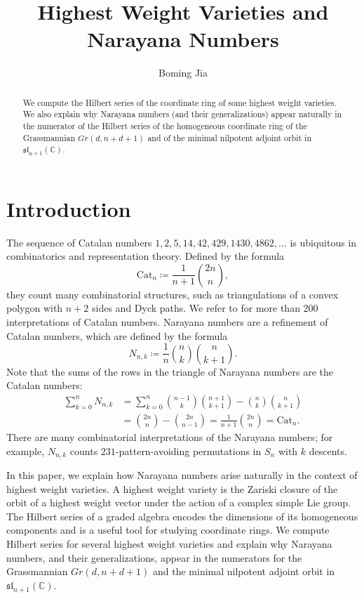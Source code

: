 \documentclass[12pt]{extarticle}
\title{Highest Weight Varieties and Narayana Numbers}
\author{Boming Jia}
\date{}
\theoremstyle{plain}
\theoremstyle{definition}
\theoremstyle{remark}
\newcommand{\Cat}{\mathrm{Cat}}
\begin{document}
\maketitle

\vspace{-5em}
\begin{abstract} 
    We compute the Hilbert series of the coordinate ring of some highest weight varieties. We also explain why Narayana numbers (and their generalizations) appear naturally in the numerator of the Hilbert series of the homogeneous coordinate ring of the Grassmannian $Gr(d,n+d+1)$ and of the minimal nilpotent adjoint orbit in $\mathfrak{sl}_\mathrm{n+1}(\mathbb{C})$.
\end{abstract}


\section{Introduction}
The sequence of Catalan numbers $1,2,5,14,42,429,1430,4862,\dots$ is ubiquitous in combinatorics and representation theory.
Defined by the formula
\[
\Cat_n \coloneqq \frac{1}{n+1} \binom{2n}{n},
\]
they count many combinatorial structures, such as triangulations of a convex polygon with \(n+2\) sides and Dyck paths. We refer to \cite{Stanley} for more than 200 interpretations of Catalan numbers.
 Narayana numbers are a refinement of Catalan numbers, which are defined by the formula
$$
N_{n, k}\coloneqq\frac{1}{n}\binom{n}{k}\binom{n}{k+1}.
$$
Note that the sums of the rows in the triangle of Narayana numbers are the Catalan numbers:
\begin{align*}
    \sum_{k=0}^n N_{n,k}
    &= \sum_{k=0}^n\binom{n-1}{k}\binom{n+1}{k+1}-\binom{n}{k}\binom{n}{k+1} \\
    &= \binom{2n}{n}-\binom{2n}{n-1}
    = \frac{1}{n+1}\binom{2n}{n}
    = \Cat_n.
\end{align*}
There are many combinatorial interpretations of the Narayana numbers; for example, $N_{n,k}$ counts $231$-pattern-avoiding permutations in $S_n$ with $k$ descents.

In this paper, we explain how Narayana numbers arise naturally in the context of highest weight varieties. A highest weight variety is the Zariski closure of the orbit of a highest weight vector under the action of a complex simple Lie group. The Hilbert series of a graded algebra encodes the dimensions of its homogeneous components and is a useful tool for studying coordinate rings. We compute Hilbert series for several highest weight varieties and explain why Narayana numbers, and their generalizations, appear in the numerators for the Grassmannian \(Gr(d,n+d+1)\) and the minimal nilpotent adjoint orbit in \(\mathfrak{sl}_{n+1}(\mathbb{C})\).
\end{document}
